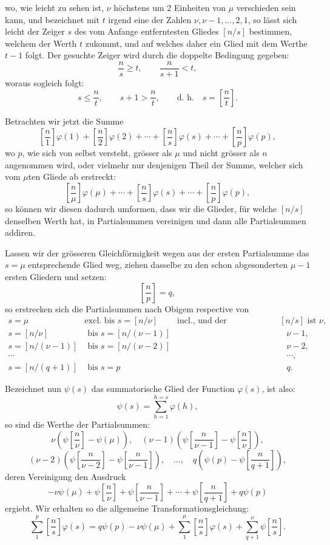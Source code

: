 \documentclass[11pt]{article}
\newcommand{\floor}[1]{\left[#1\right]}
\begin{document}
wo, wie leicht zu sehen ist, $\nu$ höchstens um 2 Einheiten von $\mu$ verschieden sein kann, und bezeichnet mit $t$ irgend eine der Zahlen $\nu,\nu-1,\ldots,2,1$, so lässt sich leicht der Zeiger $s$ des vom Anfange entferntesten Gliedes $\floor{n/s}$ bestimmen, welchem der Werth $t$ zukommt, und auf welches daher ein Glied mit dem Werthe $t-1$ folgt. Der gesuchte Zeiger wird durch die doppelte Bedingung gegeben:
\[
 \frac ns\geq t,
 \qquad \frac n{s+1}<t,
\]
woraus sogleich folgt:
\[
 s\leq \frac nt,
 \qquad s+1>\frac nt,
 \qquad \text{d. h.}\quad s=\floor{\frac nt}.
\]

Betrachten wir jetzt die Summe
\[
 \floor{\frac n1}\varphi(1)+\floor{\frac n2}\varphi(2)+\cdots+
 \floor{\frac ns}\varphi(s)+\cdots+
 \floor{\frac np}\varphi(p),
\]
wo $p$, wie sich von selbst versteht, grösser als $\mu$ und nicht grösser als $n$ angenommen wird, oder vielmehr nur denjenigen Theil der Summe, welcher sich vom $\mu$ten Gliede ab erstreckt:
\[
 \floor{\frac n\mu}\varphi(\mu)+\cdots+\floor{\frac ns}\varphi(s)+\cdots+\floor{\frac np}\varphi(p),
\]
so können wir diesen dadurch umformen, dass wir die Glieder, für welche $\floor{n/s}$ denselben Werth hat, in Partialsummen vereinigen und dann alle Partialsummen addiren.

Lassen wir der grösseren Gleichförmigkeit wegen aus der ersten Partialsumme das $s=\mu$ entsprechende Glied weg, ziehen dasselbe zu den schon abgesonderten $\mu-1$ ersten Gliedern und setzen:
\[
 \floor{\frac np}=q,
\]
so erstrecken sich die Partialsummen nach Obigem respective von
\[
\begin{array}{llll}
s=\mu & \text{excl. bis } s=\floor{n/\nu} & \text{incl., und der entsprechende Werth von } \floor{n/s} \text{ ist } \nu,\\[0.4em]
s=\floor{n/\nu} & \text{ bis } s=\floor{n/(\nu-1)} & & \nu-1,\\[0.4em]
s=\floor{n/(\nu-1)} & \text{ bis } s=\floor{n/(\nu-2)} & & \nu-2,\\
\cdots &&& \cdots,\\[0.4em]
s=\floor{n/(q+1)} & \text{ bis } s=p && q.
\end{array}
\]

Bezeichnet nun $\psi(s)$ das summatorische Glied der Function $\varphi(s)$, ist also:
\[
 \psi(s)=\sum_{h=1}^{h=s}\varphi(h),
\]
so sind die Werthe der Partialsummen:
\[
 \nu\left(\psi\floor{\frac n\nu}-\psi(\mu)\right),\quad
 (\nu-1)\left(\psi\floor{\frac n{\nu-1}}-\psi\floor{\frac n\nu}\right),
\]
\[
 (\nu-2)\left(\psi\floor{\frac n{\nu-2}}-\psi\floor{\frac n{\nu-1}}\right),\quad\ldots,\quad
 q\left(\psi(p)-\psi\floor{\frac n{q+1}}\right),
\]
deren Vereinigung den Ausdruck
\[
 -\nu\psi(\mu)+\psi\floor{\frac n\nu}+
 \psi\floor{\frac n{\nu-1}}+\cdots+
 \psi\floor{\frac n{q+1}}+q\psi(p)
\]
ergiebt. Wir erhalten so die allgemeine Transformationsgleichung:
\begin{equation}
 \sum_{1}^{p}\floor{\frac ns}\varphi(s)=
 q\psi(p)-\nu\psi(\mu)+\sum_{1}^{\mu}\floor{\frac ns}\varphi(s)+
 \sum_{q+1}^{\nu}\psi\floor{\frac ns}. \tag{a}
\end{equation}
\end{document}
